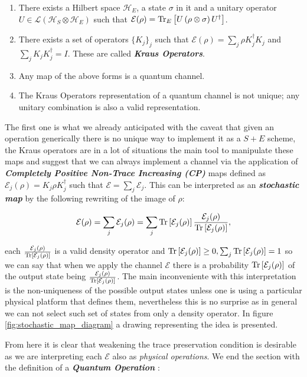 \begin{enumerate}
  \item There exists a Hilbert space $\mathcal{H}_{E}$, a state $\sigma$ in it and a unitary operator $U \in\mathcal{L}(\mathcal{H}_{S}\otimes\mathcal{H}_{E})$ such that $\mathcal{E}(\rho) = \mathrm{Tr}_{E}\left[U\left(\rho\otimes\sigma\right)U^{\dagger}\right]$.
  \item There exists a set of operators $\{K_{j} \}_{j}$ such that $\mathcal{E}(\rho) = \sum_{j}\rho K_{j}^{\dagger}K_{j}$ and $\sum_{j}K_{j}K_{j}^{\dagger}=I$. These are called \textit{\textbf{Kraus Operators}}.
  \item Any map of the above forms is a quantum channel.
  \item The Kraus Operators representation of a quantum channel is not unique; any unitary combination is also a valid representation.
\end{enumerate}
The first one is what we already anticipated with the caveat that given an operation generically there is no unique way to implement it as
a $S+E$ scheme, the Kraus operators are in a lot of situations the main tool to manipulate these maps and suggest that we can
always implement a channel via the application of \textbf{\textit{Completely Positive Non-Trace Increasing (CP)}} maps  defined as $\mathcal{E}_{j}(\rho)=K_{j}\rho K_{j}^{\dagger}$ such that $\mathcal{E} = \sum_{j}\mathcal{E}_{j}$. This can be interpreted as an \textbf{\textit{stochastic map}} \cite{nielsen_quantum_2010} by the following
rewriting of the image of $\rho$:

\begin{equation}
  \mathcal{E}(\rho) = \sum_{j}\mathcal{E}_{j}(\rho) = \sum_{j}\mathrm{Tr}\left[\mathcal{E}_{j}(\rho)\right]\frac{\mathcal{E}_{j}(\rho)}{\mathrm{Tr}\left[\mathcal{E}_{j}(\rho)\right]},
\end{equation}

each $\frac{\mathcal{E}_{j}(\rho)}{\mathrm{Tr}\left[\mathcal{E}_{j}(\rho)\right]}$ is a valid density operator and $\mathrm{Tr}\left[\mathcal{E}_{j}(\rho)\right]\geq 0,
\sum_{j}\mathrm{Tr}\left[\mathcal{E}_{j}(\rho)\right]=1$ so we can say that when we apply the channel $\mathcal{E}$ there is a probability
$\mathrm{Tr}\left[\mathcal{E}_{j}(\rho)\right]$ of the output state being $\frac{\mathcal{E}_{j}(\rho)}{\mathrm{Tr}\left[\mathcal{E}_{j}(\rho)\right]}$. The main inconveniente
with this interpretation is the non-uniqueness of the possible output states unless one is using a particular physical platform that
defines them, nevertheless this is no surprise as in general we can not select such set of states from only a density operator. In figure
\ref{fig:stochastic_map_diagram} a drawing representing the idea is presented.

From here it is clear that weakening the trace preservation condition is desirable as we are interpreting each $\mathcal{E}$ also as
\textit{physical operations}. We end the section with the definition of a \textbf{\textit{Quantum Operation}} \cite{strasberg2022quantum,nielsen_quantum_2010,wiseman_quantum_2010}:

